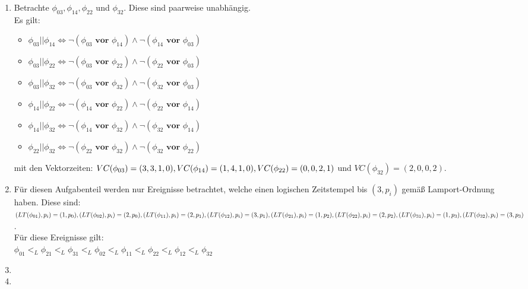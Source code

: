 \documentclass[12pt, paper=a4]{article}
\begin{document}
\begin{enumerate}
	\item Betrachte \(\phi_{03}, \phi_{14}, \phi_{22}\) und \(\phi_{32}\). Diese sind paarweise unabh\"angig.\\
	Es gilt:
		\begin{itemize}
			\item \(\phi_{03} || \phi_{14} \Leftrightarrow \lnot (\phi_{03} \textbf{ vor } \phi_{14}) \land  
			\lnot (\phi_{14} \textbf{ vor } \phi_{03})\)
			\item \(\phi_{03} || \phi_{22} \Leftrightarrow \lnot (\phi_{03} \textbf{ vor } \phi_{22}) \land  
			\lnot (\phi_{22} \textbf{ vor } \phi_{03})\)
			\item \(\phi_{03} || \phi_{32} \Leftrightarrow \lnot (\phi_{03} \textbf{ vor } \phi_{32}) \land  
			\lnot (\phi_{32} \textbf{ vor } \phi_{03})\)
			\item \(\phi_{14} || \phi_{22} \Leftrightarrow \lnot (\phi_{14} \textbf{ vor } \phi_{22}) \land  
			\lnot (\phi_{22} \textbf{ vor } \phi_{14})\)
			\item \(\phi_{14} || \phi_{32} \Leftrightarrow \lnot (\phi_{14} \textbf{ vor } \phi_{32}) \land  
			\lnot (\phi_{32} \textbf{ vor } \phi_{14})\)
			\item \(\phi_{22} || \phi_{32} \Leftrightarrow \lnot (\phi_{22} \textbf{ vor } \phi_{32}) \land  
			\lnot (\phi_{32} \textbf{ vor } \phi_{22})\)
		\end{itemize}
	mit den Vektorzeiten: \(VC(\phi_{03})=(3,3,1,0), VC(\phi_{14})=(1,4,1,0),\\
	VC(\phi_{22})=(0,0,2,1)\) und \(VC(\phi_{32})=(2,0,0,2)\).
	
	\item F\"ur diesen Aufgabenteil werden nur Ereignisse betrachtet, welche einen logischen Zeitstempel bis \((3,p_i)\)
	gem\"a{\ss} Lamport-Ordnung haben. Diese sind:\\
	\((LT(\phi_{01}),p_i)=(1,p_0), (LT(\phi_{02}),p_i)=(2,p_0),\\
	(LT(\phi_{11}),p_i)=(2,p_1), (LT(\phi_{12}),p_i)=(3,p_1),\\
	(LT(\phi_{21}),p_i)=(1,p_2), (LT(\phi_{22}),p_i)=(2,p_2),\\
	(LT(\phi_{31}),p_i)=(1,p_3), (LT(\phi_{32}),p_i)=(3,p_3)\).\\
	F\"ur diese Ereignisse gilt:\\
	\(\phi_{01} <_L \phi_{21} <_L \phi_{31} <_L \phi_{02} <_L \phi_{11} <_L \phi_{22} <_L \phi_{12} <_L \phi_{32} \)
	
	\item
	
	\item
\end{enumerate}
\end{document}
